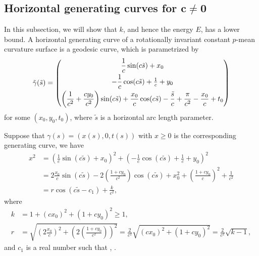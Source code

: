 \documentclass[10pt,a4paper]{amsart}
\numberwithin{equation}{section}
\begin{document}
\subsection[Horizontal generating curves for c neq 0]{Horizontal generating curves for $\boldsymbol{c\neq 0}$}

In this subsection, we will show that $k$, and hence the energy $E$, has a lower bound. A horizontal generating curve of a rotationally invariant constant $p$-mean curvature surface is a geodesic curve, which is parametrized by
\begin{equation}\label{gd}
\tilde{\gamma}(\tilde{s})=\left(\begin{matrix}
\dfrac{1}{c}\sin(c\tilde{s})+x_{0}\vspace{1mm}\\
-\dfrac{1}{c}\cos(c\tilde{s})+\frac{1}{c}+y_{0} \vspace{1mm}\\
\left(\dfrac{1}{c^2}+\dfrac{cy_{0}}{c^2}\right)\sin(c\tilde{s})+\dfrac{x_{0}}{c}\cos(c\tilde{s})-\dfrac{\tilde{s}}{c}+\dfrac{\pi}{c^2}-\dfrac{x_{0}}{c}+t_{0}\end{matrix} \right)
\end{equation}
for some $(x_{0},y_{0},t_{0})$, where $\tilde{s}$ is a horizontal arc length parameter.

Suppose that $\gamma(s)=(x(s),0,t(s))$ with $x\geq 0$ is the corresponding generating curve, we have
\begin{align*}
x^{2}&=\left(\frac{1}{c}\sin(c\tilde{s})+x_{0}\right)^{2}+\left(-\frac{1}{c}\cos(c\tilde{s})+\frac{1}{c}+y_{0}\right)^{2}\\
&=2\frac{x_{0}}{c}\sin(c\tilde{s})-2\left(\frac{1+cy_{0}}{c^2}\right)\cos(c\tilde{s})+x_{0}^{2}+\left(\frac{1+cy_{0}}{c}\right)^{2}+\frac{1}{c^2}\\
&=r\cos(c\tilde{s}-c_{1})+\frac{k}{c^2},
\end{align*}
 where
 \begin{align*}
 k&=1+(cx_{0})^{2}+(1+cy_{0})^{2}\geq 1,\\
 r&=\sqrt{\left(2\frac{x_{0}}{c}\right)^{2}+\left(2\left(\frac{1+cy_{0}}{c^2}\right)\right)^{2}}=\frac{2}{c^2}\sqrt{(cx_{0})^{2}+(1+cy_{0})^{2}}=\frac{2}{c^2}\sqrt{k-1},
 \end{align*}
 and $c_{1}$ is a real number such that
, .
\end{document}
